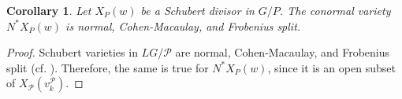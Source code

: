 \documentclass[paper=a4, fontsize=10pt]{amsart} %
\theoremstyle{plain}
\newtheorem{cor}[subsection]{Corollary}
\theoremstyle{definition}
\theoremstyle{remark}
\numberwithin{equation}{section} %
\numberwithin{figure}{section} %
\numberwithin{table}{section} %
\numberwithin{subsection}{section} %
\def\proots{\ensuremath{\Delta_0^+}}
\def\gl{\ensuremath{G}}
\def\gL{\ensuremath{L\gl}}
\def\Para{\ensuremath{\mathcal P}}
\def\mod{\ensuremath{\mathrm{mod}\,}}
\begin{document}
\begin{cor}
\label{frob}
Let $X_P(w)$ be a Schubert divisor in $G/P$.
The conormal variety $N^* X_P(w)$ is normal, Cohen-Macaulay, and Frobenius split.
\end{cor}
\begin{proof}
Schubert varieties in $\gL/\Para$ are normal, Cohen-Macaulay, and Frobenius split (cf. \cite{gf,mr}). 
Therefore, the same is true for $N^* X_P(w)$, since it is an open subset of $X_\Para(v_k^\Para)$.
\end{proof}

\end{document}
